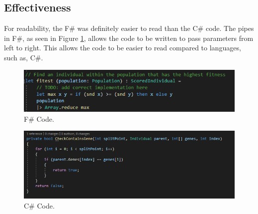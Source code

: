 \documentclass[a4paper]{article}
\begin{document}
\subsection*{Effectiveness}
For readability, the F\# was definitely easier to read than the C\# code. The pipes in F\#, as seen in Figure \ref{fig:FSharpSnippet}, allows the code to be written to pass parameters from left to right. This allows the code to be easier to read compared to languages, such as, C\#.

\begin{figure}[H]
	\center
	\includegraphics[width=0.9\linewidth]{images/FSharpSnippet.png}
	\caption{F\# Code.}
	\label{fig:FSharpSnippet}
\end{figure}

\begin{figure}[H]
	\center
	\includegraphics[width=0.9\linewidth]{images/CSharpSnippet.png}
	\caption{C\# Code.}
	\label{fig:CSharpSnippet}
\end{figure}
\end{document}
